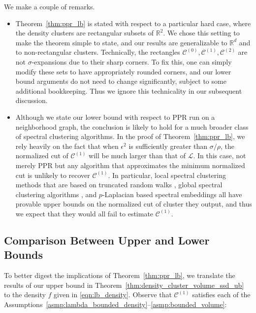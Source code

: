 \documentclass[twoside,11pt]{article}
\newcommand{\Reals}{\mathbb{R}}
\newcommand{\1}{\mathbf{1}}
\newcommand{\Rd}{\Reals^d}
\newcommand{\mc}[1]{\mathcal{#1}}
\begin{document}
We make a couple of remarks.
\begin{itemize}
	\item Theorem~\ref{thm:ppr_lb} is stated with respect to a particular hard case, where the density clusters are rectangular subsets of $\Reals^2$.  We chose this
	setting to make the theorem simple to state, and our results are generalizable
	to $\Rd$ and to non-rectangular clusters. Technically, the rectangles $\mc{C}^{(0)},\mc{C}^{(1)},\mc{C}^{(2)}$ are not
	$\sigma$-expansions due to their sharp corners. To fix this, one can   
	simply modify these sets to have appropriately rounded corners, and our lower
	bound arguments do not need to change significantly, subject to some
	additional bookkeeping.  Thus we ignore this technicality in our subsequent
	discussion. 
	
	\item Although we state our lower bound with respect to PPR run on a neighborhood graph, the conclusion is likely to hold for a much broader class of spectral clustering algorithms. In the proof of Theorem~\ref{thm:ppr_lb}, we rely heavily on the fact that when $\epsilon^2$ is sufficiently greater than $\sigma/\rho$, the normalized cut of $\mc{C}^{(1)}$ will be much larger than that of $\mc{L}$. In this case, not merely PPR but any algorithm that approximates the minimum normalized cut is unlikely to recover $\mc{C}^{(1)}$. In particular, local spectral clustering methods that are based on truncated random walks \citep{spielman2013}, global spectral clustering algorithms \citep{shi00}, and $p$-Laplacian based spectral embeddings \citep{hein2010} all have provable upper bounds on the normalized cut of cluster they output, and thus we expect that they would all fail to estimate $\mc{C}^{(1)}$.
\end{itemize}

\subsection{Comparison Between Upper and Lower Bounds}
\label{subsec:comparison_upper_lower_bounds}
To better digest the implications of Theorem~\ref{thm:ppr_lb}, we translate the
results of our upper bound in Theorem~\ref{thm:density_cluster_volume_ssd_ub} to the density $f$ given in \eqref{eqn:lb_density}. Observe that $\mc{C}^{(1)}$ satisfies each of the Assumptions~\ref{asmp:lambda_bounded_density}--\ref{asmp:bounded_volume}:
\end{document}
